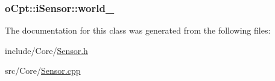 \subsubsection[{\texorpdfstring{world\+\_\+}{world_}}]{ o\+Cpt\+::i\+Sensor\+::world\+\_\+\hspace{0.3cm}{\ttfamily [protected]}}\hypertarget{classo_cpt_1_1i_sensor_aab033b6462d7e8710c006f19c51e033e}{}\label{classo_cpt_1_1i_sensor_aab033b6462d7e8710c006f19c51e033e}


The documentation for this class was generated from the following files\+:\begin{DoxyCompactItemize}
\item 
include/\+Core/\hyperlink{_sensor_8h}{Sensor.\+h}\item 
src/\+Core/\hyperlink{_sensor_8cpp}{Sensor.\+cpp}\end{DoxyCompactItemize}
